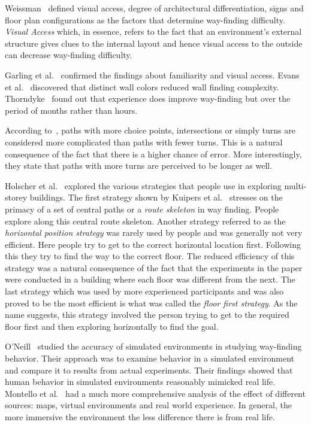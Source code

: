 Weissman~\cite{Weisman01031981} defined visual access, degree of architectural differentiation, signs and floor plan configurations as the factors that determine way-finding difficulty. \emph{Visual Access} which, in essence, refers to the fact that an environment's external structure gives clues to the internal layout and hence visual access to the outside can decrease way-finding difficulty.

Garling et al.~\cite{garling1983orientation} confirmed the findings about familiarity and visual access. Evans et al.~\cite{evans1980cognitive} discovered that distinct wall colors reduced wall finding complexity. Thorndyke~\cite{Thorndyke1980} found out that experience does improve way-finding but over the period of months rather than hours.

According to~\cite{Gopal1989309}, paths with more choice points, intersections or simply turns are considered more complicated than paths with fewer turns. This is a natural consequence of the fact that there is a higher chance of error. More interestingly, they state that paths with more turns are perceived to be longer as well.

Holscher et al.~\cite{HolscherBMS06} explored the various strategies that people use in exploring multi-storey buildings. The first strategy shown by Kuipers et al.~\cite{Kuipers01012003} stresses on the primacy of a set of central paths or a \emph{route skeleton} in way finding. People explore along this central route skeleton. Another strategy referred to as the \emph{horizontal position strategy} was rarely used by people and was generally not very efficient. Here people try to get to the correct horizontal location first. Following this they try to find the way to the correct floor. The reduced efficiency of this strategy was a natural consequence of the fact that the experiments in the paper were conducted in a building where each floor was different from the next. The last strategy which was used by more experienced participants and was also proved to be the most efficient is what was called the \emph{floor first strategy}. As the name suggests, this strategy involved the person trying to get to the required floor first and then exploring horizontally to find the goal.

O'Neill~\cite{O'Neill1992319} studied the accuracy of simulated environments in studying way-finding behavior. Their approach was to examine behavior in a simulated environment and compare it to results from actual experiments. Their findings showed that human behavior in simulated environments reasonably mimicked real life. Montello et al.~\cite{Montello:2004uj} had a much more comprehensive analysis of the effect of different sources: maps, virtual environments and real world experience. In general, the more immersive the environment the less difference there is from real life. %

